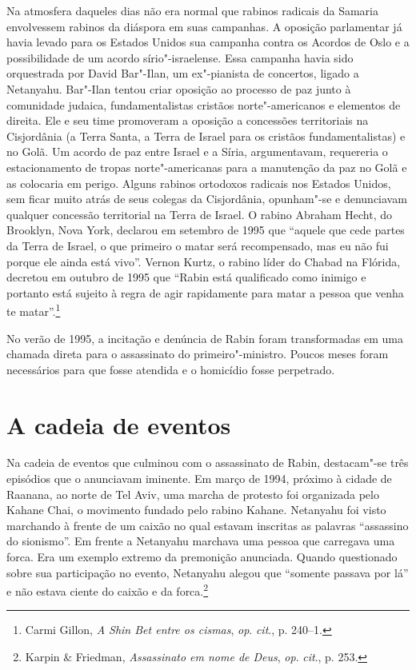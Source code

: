 Na atmosfera daqueles dias não era normal que rabinos radicais da
Samaria envolvessem rabinos da diáspora em suas campanhas. A oposição
parlamentar já havia levado para os Estados Unidos sua campanha contra
os Acordos de Oslo e a possibilidade de um acordo sírio"-israelense. Essa
campanha havia sido orquestrada por David Bar"-Ilan, um ex"-pianista de
concertos, ligado a Netanyahu. Bar"-Ilan tentou criar oposição ao
processo de paz junto à comunidade judaica, fundamentalistas cristãos
norte"-americanos e elementos de direita. Ele e seu time promoveram
a oposição a concessões territoriais na Cisjordânia (a Terra Santa, a
Terra de Israel para os cristãos fundamentalistas) e no Golã. Um acordo
de paz entre Israel e a Síria, argumentavam, requereria o estacionamento
de tropas norte"-americanas para a manutenção da paz no Golã e as
colocaria em perigo. Alguns rabinos ortodoxos radicais nos Estados
Unidos, sem ficar muito atrás de seus colegas da Cisjordânia, opunham"-se
e denunciavam qualquer concessão territorial na Terra de Israel. O
rabino Abraham Hecht, do Brooklyn, Nova York, declarou em setembro de
1995 que ``aquele que cede partes da Terra de Israel, o que primeiro o
matar será recompensado, mas eu não fui porque ele ainda está vivo''.
Vernon Kurtz, o rabino líder do Chabad na Flórida, decretou em outubro de 1995
que ``Rabin está qualificado como inimigo e portanto está sujeito à
regra de agir rapidamente para matar a pessoa que venha te
matar''.\footnote{Carmi Gillon, \textit{A Shin Bet entre os cismas}, 
\textit{op}. \textit{cit}., p. 240--1.}

No verão de 1995, a incitação e denúncia de Rabin foram transformadas em
uma chamada direta para o assassinato do primeiro"-ministro. Poucos meses
foram necessários para que fosse atendida e o homicídio fosse
perpetrado.

\section{A cadeia de eventos}

Na cadeia de eventos que culminou com o assassinato de Rabin,
destacam"-se três episódios que o anunciavam iminente. Em março de 1994,
próximo à cidade de Raanana, ao norte de Tel Aviv, uma marcha de protesto
foi organizada pelo Kahane Chai, o movimento fundado pelo rabino Kahane.
Netanyahu foi visto marchando à frente de um caixão no qual estavam
inscritas as palavras ``assassino do sionismo''. Em frente a Netanyahu
marchava uma pessoa que carregava uma forca. Era um exemplo extremo da
premonição anunciada. Quando questionado sobre sua participação no
evento, Netanyahu alegou que ``somente passava por lá'' e não estava
ciente do caixão e da forca.\footnote{Karpin \& Friedman, 
\textit{Assassinato em nome de Deus}, \textit{op}. \textit{cit}., p. 253.}

